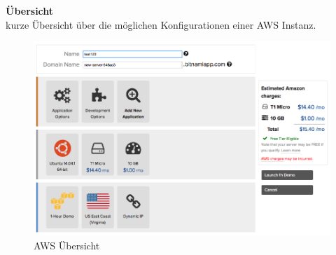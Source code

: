 \textbf{Übersicht}\\
kurze Übersicht über die möglichen Konfigurationen einer AWS Instanz.
\begin{figure}[!htbp]
  \includegraphics[width=\textwidth]{./03_Analyse/03_Bitnami/images/aws_overview}
  \caption{AWS Übersicht}
\end{figure}

